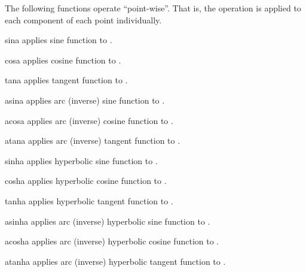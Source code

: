 The following functions operate ``point-wise''. That is, the operation is applied to each component of each point
individually.

\begin{funcdesc}{sin}{a}
applies sine function to .
\end{funcdesc}

\begin{funcdesc}{cos}{a}
applies cosine function to .
\end{funcdesc}

\begin{funcdesc}{tan}{a}
applies tangent function to .
\end{funcdesc}

\begin{funcdesc}{asin}{a}
applies arc (inverse) sine function to .
\end{funcdesc}

\begin{funcdesc}{acos}{a}
applies arc (inverse) cosine function to .
\end{funcdesc}

\begin{funcdesc}{atan}{a}
applies arc (inverse) tangent function to .
\end{funcdesc}

\begin{funcdesc}{sinh}{a}
applies hyperbolic sine function to .
\end{funcdesc}

\begin{funcdesc}{cosh}{a}
applies hyperbolic cosine function to .
\end{funcdesc}

\begin{funcdesc}{tanh}{a}
applies hyperbolic tangent function to .
\end{funcdesc}

\begin{funcdesc}{asinh}{a}
applies arc (inverse) hyperbolic sine function to .
\end{funcdesc}

\begin{funcdesc}{acosh}{a}
applies arc (inverse) hyperbolic cosine function to .
\end{funcdesc}

\begin{funcdesc}{atanh}{a}
applies arc (inverse) hyperbolic tangent function to .
\end{funcdesc}

